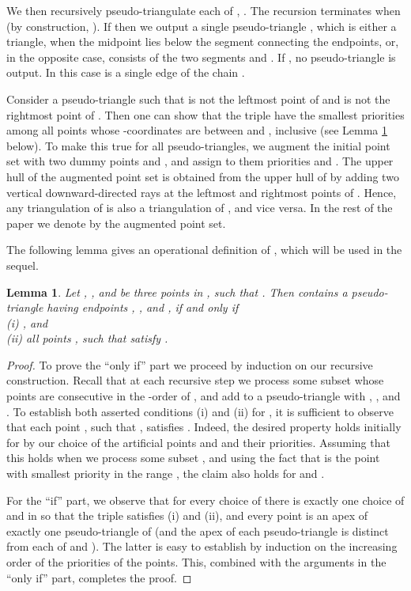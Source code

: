 \documentclass[11pt]{article}
\newtheorem{lemma}[theorem]{Lemma}
\begin{document}
We then recursively pseudo-triangulate
each of , . The recursion
terminates when  (by construction, ). If  then we output a single pseudo-triangle , which is either a triangle,
when the midpoint lies below the segment connecting the endpoints, or, in the opposite case,
consists of the two segments  and
. If , no pseudo-triangle is output. In this case  is a single edge of the chain . 


Consider a pseudo-triangle  such that 
 is not the leftmost point of  and 
 is not the rightmost point of .
Then one can show that the triple 
 have the smallest priorities
among all points whose -coordinates are between 
and , inclusive (see Lemma \ref{Lemma:ConditionPseudo} below). To make this true for all 
pseudo-triangles, we
 augment the initial point set  with two dummy points
 and , and
assign to them priorities  and .
The upper hull of the augmented point set is
obtained from the upper hull of  by adding two vertical downward-directed rays at the leftmost and rightmost points of . Hence, any triangulation of  is also a triangulation of , and vice versa.
In the rest of the paper we denote by  the augmented point
set. 

The following lemma gives an operational definition of
, which will be used in the sequel.

\begin{lemma}\label{Lemma:ConditionPseudo}
  Let , , and  be three points in , such that
  . Then  contains a pseudo-triangle
   having endpoints , , and
  , if and only if\\ (i)
  , and\\ 
  (ii) all points , such that  satisfy .
\end{lemma}

\begin{proof}
  To prove the ``only if'' part we proceed by induction on our
  recursive construction.  Recall that at each recursive step we
  process some subset  whose points are
  consecutive in the -order of , and add to
   a pseudo-triangle  with
  , , and
  .  To establish both asserted conditions (i)
  and (ii) for , it is sufficient to observe that each point
  , such that , satisfies
  .  Indeed,
  the desired property holds initially for  by our choice of
  the artificial points  and  and their
  priorities. Assuming that this holds when we process some subset
  , and using the fact that  is the point with smallest
  priority in the range , the claim
  also holds for  and .

  For the ``if'' part, we observe that for every choice of 
  there is exactly one choice of  and  in  so that the triple
   satisfies (i) and (ii), and every point  is an
  apex of exactly one pseudo-triangle of  (and the
  apex of each pseudo-triangle is distinct from each of
   and ). 
  The latter is easy to establish by induction on the increasing order of the priorities of the points.
  This, combined with the arguments in the
  ``only if'' part, completes the proof.
\end{proof}
\end{document}
